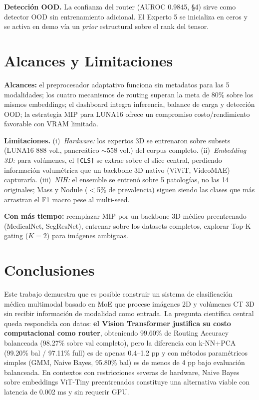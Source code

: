 \documentclass[11pt, a4paper]{article}
\begin{document}
\textbf{Detección OOD.} La confianza del router (AUROC 0.9845, §4) sirve
como detector OOD sin entrenamiento adicional. El Experto 5 se inicializa
en ceros y se activa en demo vía un \textit{prior} estructural sobre el
rank del tensor.

\section{Alcances y Limitaciones}

\textbf{Alcances:} el preprocesador adaptativo funciona sin metadatos para
las 5 modalidades; los cuatro mecanismos de routing superan la meta de 80\%
sobre los mismos embeddings; el dashboard integra inferencia, balance de
carga y detección OOD; la estrategia MIP para LUNA16 ofrece un compromiso
costo/rendimiento favorable con VRAM limitada.

\textbf{Limitaciones.} (i)~\textit{Hardware:} los expertos 3D se entrenaron
sobre subsets (LUNA16 888 vol., pancreático $\sim$558 vol.) del corpus
completo. (ii)~\textit{Embedding 3D:} para volúmenes, el \texttt{[CLS]} se
extrae sobre el slice central, perdiendo información volumétrica que un
backbone 3D nativo (ViViT, VideoMAE) capturaría. (iii)~\textit{NIH:} el
ensemble se entrenó sobre 5 patologías, no las 14 originales; Mass y Nodule
($<$5\% de prevalencia) siguen siendo las clases que más arrastran el F1
macro pese al multi-seed.

\textbf{Con más tiempo:} reemplazar MIP por un backbone 3D médico
preentrenado (MedicalNet, SegResNet), entrenar sobre los datasets
completos, explorar Top-K gating ($K=2$) para imágenes ambiguas.

\section{Conclusiones}

Este trabajo demuestra que es posible construir un sistema de clasificación
médica multimodal basado en MoE que procese imágenes 2D y volúmenes CT 3D
sin recibir información de modalidad como entrada. La pregunta científica
central queda respondida con datos: \textbf{el Vision Transformer justifica
su costo computacional como router}, obteniendo 99.60\% de Routing Accuracy
balanceada (98.27\% sobre val completo), pero la diferencia con k-NN+PCA
(99.20\% bal / 97.11\% full) es de apenas 0.4--1.2 pp y con métodos
paramétricos simples (GMM, Naive Bayes, 95.80\% bal) es de menos de 4 pp
bajo evaluación balanceada. En contextos con restricciones severas de
hardware, Naive Bayes sobre embeddings ViT-Tiny preentrenados constituye
una alternativa viable con latencia de 0.002 ms y sin requerir GPU.
\end{document}
